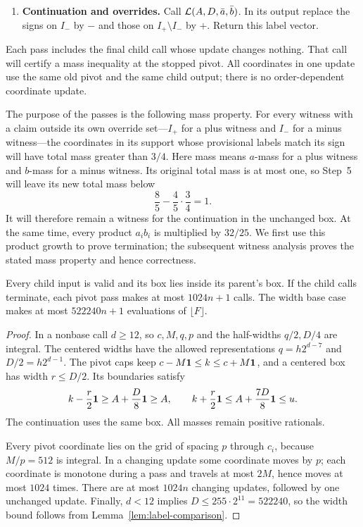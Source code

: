 \begin{enumerate}
\item \textbf{Continuation and overrides.}
Call $\mathcal L(A,D,\bar a,\bar b)$.  In its output replace the signs
on $I_-$ by $-$ and those on $I_+\setminus I_-$ by $+$.
Return this label vector.
\end{enumerate}

Each pass includes the final child call whose update changes nothing.
That call will certify a mass inequality at the stopped pivot.  All
coordinates in one update use the same old pivot and the same child
output; there is no order-dependent coordinate update.

The purpose of the passes is the following mass property. For every
witness with a claim outside its own override set---$I_+$ for a plus
witness and $I_-$ for a minus witness---the coordinates in its support
whose provisional labels match its sign will have total mass greater
than $3/4$. Here mass means $a$-mass for a plus witness and $b$-mass
for a minus witness. Its original total mass is at most one, so
Step~5 will leave its new total mass below
\[
                  \frac85-\frac45\cdot\frac34=1.
\]
It will therefore remain a witness for the continuation in the
unchanged box. At the same time, every product $a_i b_i$ is multiplied
by $32/25$. We first use this product growth to prove termination;
the subsequent witness analysis proves the stated mass property and
hence correctness.

\begin{lemma}
\label{lem:label-mechanics}
Every child input is valid and its box lies inside its parent's box.
If the child calls terminate, each pivot pass makes at most
$1024n+1$ calls.  The width base case makes at most
$522240n+1$ evaluations of $\lfloor F\rfloor$.
\end{lemma}

\begin{proof}
In a nonbase call $d\ge12$, so $c,M,q,p$ and the half-widths
$q/2,D/4$ are integral.  The centered widths have the allowed
representations $q=h2^{d-7}$ and $D/2=h2^{d-1}$.
The pivot caps keep $c-M\mathbf 1\le k\le c+M\mathbf 1$, and a centered
box has width $r\le D/2$.  Its boundaries satisfy
\[
 k-\frac r2\mathbf 1\ge A+\frac D8\mathbf 1\ge A,
 \qquad
 k+\frac r2\mathbf 1\le A+\frac{7D}8\mathbf 1\le u.
\]
The continuation uses the same box.  All masses remain positive
rationals.

Every pivot coordinate lies on the grid of spacing $p$ through
$c_i$, because $M/p=512$ is integral.  In a changing update some
coordinate moves by $p$; each coordinate is monotone during a pass
and travels at most $2M$, hence moves at most $1024$ times.
There are at most $1024n$ changing updates, followed by one
unchanged update.  Finally, $d<12$ implies
$D\le255\cdot2^{11}=522240$, so the width bound follows from
Lemma~\ref{lem:label-comparison}.
\end{proof}

